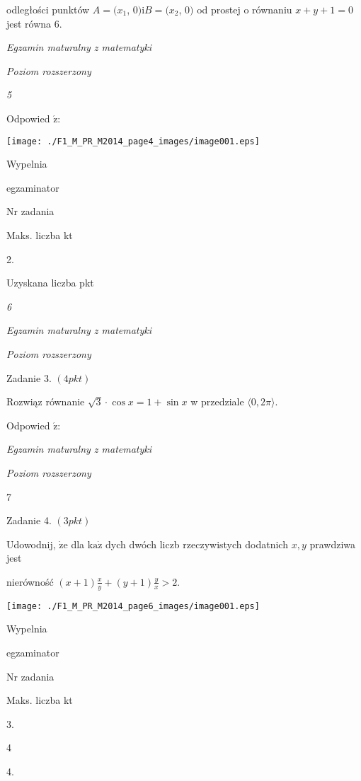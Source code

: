 \documentclass[a4paper,12pt]{article}
\begin{document}
odległości punktów $A=(x_{1}$, 0$) \mathrm{i}B=(x_{2}$, 0$)$ od prostej o równaniu $x+y+1=0$ jest równa 6.





{\it Egzamin maturalny z matematyki}

{\it Poziom rozszerzony}

{\it 5}

Odpowied $\acute{\mathrm{z}}$:
\begin{center}
\texttt{[image: ./F1\_M\_PR\_M2014\_page4\_images/image001.eps]}
\end{center}
Wypelnia

egzaminator

Nr zadania

Maks. liczba kt

2.

Uzyskana liczba pkt





{\it 6}

{\it Egzamin maturalny z matematyki}

{\it Poziom rozszerzony}

Zadanie 3. $(4pkt)$

Rozwiąz równanie $\sqrt{3}\cdot\cos x=1+\sin x$ w przedziale $\langle 0, 2\pi\rangle.$

Odpowied $\acute{\mathrm{z}}$:





{\it Egzamin maturalny z matematyki}

{\it Poziom rozszerzony}

7

Zadanie 4. $(3pkt)$

Udowodnij, $\dot{\mathrm{z}}\mathrm{e}$ dla $\mathrm{k}\mathrm{a}\dot{\mathrm{z}}$ dych dwóch liczb rzeczywistych dodatnich $x, y$ prawdziwa jest

nierówność $(x+1)\displaystyle \frac{x}{y}+(y+1)\frac{y}{x}>2.$
\begin{center}
\texttt{[image: ./F1\_M\_PR\_M2014\_page6\_images/image001.eps]}
\end{center}
Wypelnia

egzaminator

Nr zadania

Maks. liczba kt

3.

4

4.
\end{document}
